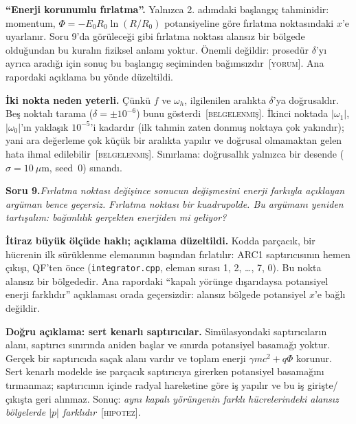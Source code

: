 \documentclass[11pt,a4paper]{article}
\newcommand{\kod}[1]{{\XeTeXinterchartokenstate=0\texttt{#1}}}
\newcommand{\BEL}{\textsc{[belgelenmiş]}}
\newcommand{\YOR}{\textsc{[yorum]}}
\newcommand{\HIP}{\textsc{[hipotez]}}
\newcounter{soru}
\newcommand{\soru}[2]{%
  \par\medskip\noindent\textbf{Soru #1.}\enspace\textit{#2}\par\nopagebreak\smallskip}
\begin{document}
\textbf{``Enerji korunumlu fırlatma''.} Yalnızca 2. adımdaki başlangıç tahminidir: momentum,
$\Phi=-E_0R_0\ln(R/R_0)$ potansiyeline göre fırlatma noktasındaki $x$'e uyarlanır. Soru 9'da görüleceği
gibi fırlatma noktası alansız bir bölgede olduğundan bu kuralın fiziksel anlamı yoktur. Önemli değildir:
prosedür $\delta$'yı ayrıca aradığı için sonuç bu başlangıç seçiminden bağımsızdır~\YOR. Ana rapordaki
açıklama bu yönde düzeltildi.

\textbf{İki nokta neden yeterli.} Çünkü $f$ ve $\omega_h$, ilgilenilen aralıkta $\delta$'ya doğrusaldır.
Beş noktalı tarama ($\delta=\pm10^{-6}$) bunu gösterdi~\BEL. İkinci noktada $|\omega_1|$, $|\omega_0|$'ın
yaklaşık $10^{-5}$'i kadardır (ilk tahmin zaten donmuş noktaya çok yakındır); yani ara değerleme çok
küçük bir aralıkta yapılır ve doğrusal olmamaktan gelen hata ihmal edilebilir~\BEL. Sınırlama: doğrusallık
yalnızca bir desende ($\sigma=10~\mu$m, seed~0) sınandı.

\soru{9}{Fırlatma noktası değişince sonucun değişmesini enerji farkıyla açıklayan argüman bence geçersiz.
Fırlatma noktası bir kuadrupolde. Bu argümanı yeniden tartışalım: bağımlılık gerçekten enerjiden mi geliyor?}

\textbf{İtiraz büyük ölçüde haklı; açıklama düzeltildi.} Kodda parçacık, bir hücrenin ilk sürüklenme
elemanının başından fırlatılır: ARC1 saptırıcısının hemen çıkışı, QF'ten önce (\kod{integrator.cpp},
eleman sırası 1, 2, \dots, 7, 0). Bu nokta alansız bir bölgededir. Ana rapordaki ``kapalı yörünge
dışarıdaysa potansiyel enerji farklıdır'' açıklaması orada geçersizdir: alansız bölgede potansiyel
$x$'e bağlı değildir.

\textbf{Doğru açıklama: sert kenarlı saptırıcılar.} Simülasyondaki saptırıcıların alanı, saptırıcı
sınırında aniden başlar ve sınırda potansiyel basamağı yoktur. Gerçek bir saptırıcıda saçak alanı vardır ve
toplam enerji $\gamma mc^2+q\Phi$ korunur. Sert kenarlı modelde ise parçacık saptırıcıya girerken potansiyel
basamağını tırmanmaz; saptırıcının içinde radyal hareketine göre iş yapılır ve bu iş girişte/çıkışta geri
alınmaz. Sonuç: \emph{aynı kapalı yörüngenin farklı hücrelerindeki alansız bölgelerde $|p|$ farklıdır}~\HIP.
\end{document}
